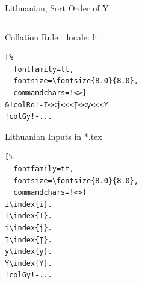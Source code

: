 \documentclass[aspectratio=169,10pt]{beamer}
\begin{document}


\begin{frame}[fragile]{Lithuanian, Sort Order of Y}

\begin{columns}
\begin{column}{60mm}

\setmonofont{Noto Sans Mono}
\begin{block}{Collation Rule~~\scriptsize locale: lt}
\begin{Verbatim}[%
  fontfamily=tt,
  fontsize=\fontsize{8.0}{8.0},
  commandchars=!<>]
&!colRd!-I<<į<<<Į<<y<<<Y
!colGy!-...
\end{Verbatim}
\end{block}
\begin{exampleblock}{Lithuanian Inputs in *.tex}
\begin{Verbatim}[%
  fontfamily=tt,
  fontsize=\fontsize{8.0}{8.0},
  commandchars=!<>]
i\index{i}.
I\index{I}.
į\index{į}.
Į\index{Į}.
y\index{y}.
Y\index{Y}.
!colGy!-...
\end{Verbatim}
\end{exampleblock}
\end{column}

\begin{column}{60mm}
\begin{center}
%
\end{center}
\end{column}
\end{columns}

\end{frame}

\end{document}
